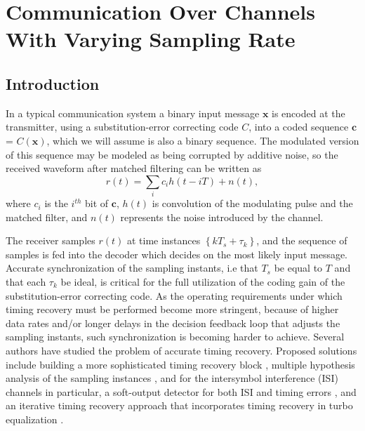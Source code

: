 \part[Communication Over Channels With Varying Sampling Rate]{Communication Over Channels With Varying Sampling Rate}
\chapter[Introduction]{Introduction}\label{intro1}

In a typical communication system a binary input message
$\mathbf{x}$ is encoded at the transmitter, using a
substitution-error correcting code $C$, into a coded sequence
$\mathbf{c}$ = $C(\mathbf{x})$, which we will assume is also a
binary sequence. The modulated version of this sequence may be
modeled as being corrupted by additive noise, so the received
waveform after matched filtering  can be written as
\begin{equation}
r(t)=\sum_{i} c_i h(t-iT) +n(t),
\end{equation}
where $c_i$ is the $i^{th}$%
bit of $\mathbf{c}$, $h(t)$ is convolution of the modulating pulse
and the matched filter, and $n(t)$ represents the noise introduced
by the channel.

The receiver samples $r(t)$ at time instances
$\left\{kT_s+\tau_k\right\} $, and the sequence of samples is fed
into the decoder which decides on the most likely input message.
Accurate synchronization of the sampling instants, i.e that $T_s$
be equal to $T$ and that each $\tau_k$ be ideal, is critical for
the full utilization of the coding gain of the substitution-error
correcting code. As the operating requirements under which timing
recovery must be performed become more stringent, because of
higher data rates and/or longer delays in the decision feedback
loop that adjusts the sampling instants, such synchronization is
becoming harder to achieve. Several authors have studied the
problem of accurate timing recovery. Proposed solutions include
building a more sophisticated timing recovery block \cite{liu:02},
multiple hypothesis analysis of the sampling instances
\cite{kbek:04}, and for the intersymbol interference (ISI)
channels in particular, a soft-output detector for both ISI and
timing errors \cite{zhangkavcic:03}, and an iterative timing
recovery approach that incorporates timing recovery in turbo
equalization \cite{iterativetr:04}.

